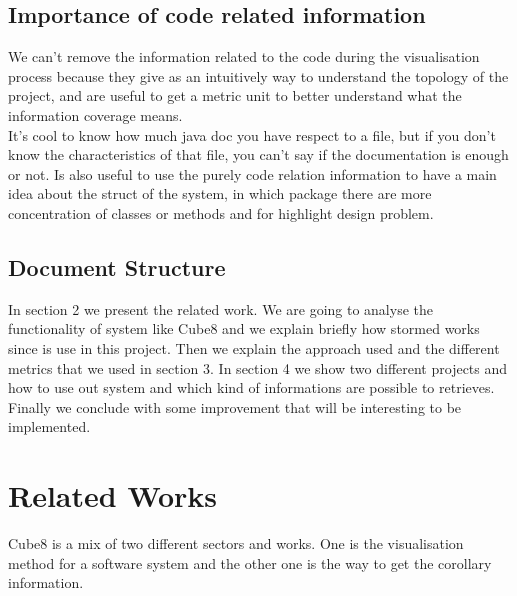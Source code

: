 \documentclass[]{usiinfbachelorproject}
\begin{document}
\subsection{Importance of code related information} 
We can't remove the information related to the code during the visualisation process because they give as an intuitively way to understand the topology of the project, and are useful to get a metric unit to better understand what the information coverage means.\\ It's cool to know how much java doc you have respect to a file, but if you don't know the characteristics of that file, you can't say if the documentation is enough or not. Is also useful to use the purely code relation information to have a main idea about the struct of the system, in which package there are more concentration of classes or methods and for highlight design problem.
 

\subsection{Document Structure} 
In section 2 we present the related work. We are going to analyse the functionality of system like Cube8 and we explain briefly how stormed works since is use in this project.
Then we explain the approach used and the different metrics that we used in section 3.
In section 4 we show  two different projects and how to use out system and which kind of informations are possible to retrieves.
Finally we conclude with some improvement that will be interesting  to be implemented.


\newpage


  
\section{Related Works} \label{related works}
Cube8 is a mix of two different sectors and works. One is the visualisation method for a software system and the other one is the way to get the corollary information.\\
\end{document}
